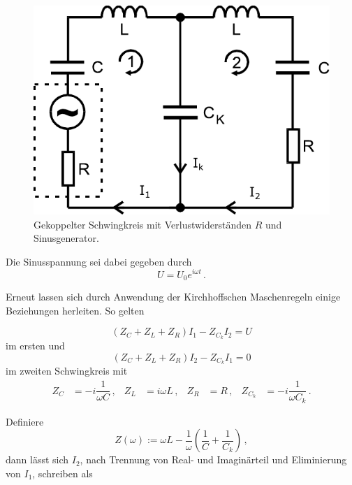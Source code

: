 \begin{figure}
    \centering
    \includegraphics{SinSchwingkreisAbb.pdf}
    \caption{Gekoppelter Schwingkreis mit Verlustwiderständen $R$ und Sinusgenerator\cite{ap04}.}
    \label{fig:SinSchwingkreisAbb}
\end{figure}

Die Sinusspannung sei dabei gegeben durch
\begin{equation*}
    U = U_0 e^{iωt}\,.
\end{equation*}

Erneut lassen sich durch Anwendung der Kirchhoffschen Maschenregeln einige Beziehungen herleiten. So gelten

\begin{equation}
    (Z_C + Z_L + Z_R)I_1 - Z_{C_k}I_2 = U
\end{equation}
im ersten und
\begin{equation}
    (Z_C + Z_L + Z_R)I_2 -Z_{C_k}I_1 = 0
\end{equation}
im zweiten Schwingkreis mit 
\begin{align*}
    Z_C     &= -i\dfrac{1}{ωC}\,,   &  Z_L     &= iωL\,,  &   Z_R     &= R\,,   &    Z_{C_k} &= -i\dfrac{1}{ω C_k}\,.
\end{align*}

\newpage

Definiere
\begin{equation*}
    Z(ω) := ωL - \dfrac{1}{ω}\left(\dfrac{1}{C} + \dfrac{1}{C_k}\right)\,,
\end{equation*} dann lässt sich $I_2$, nach Trennung von Real- und Imaginärteil und Eliminierung von $I_1$, schreiben als

